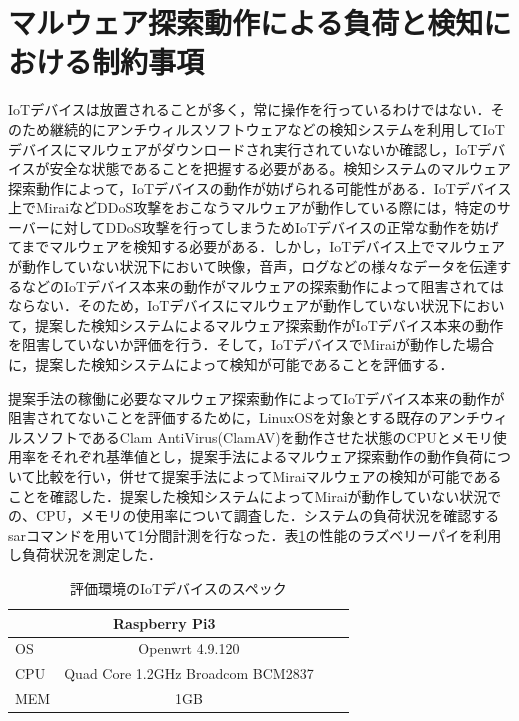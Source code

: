 \section{マルウェア探索動作による負荷と検知における制約事項}
IoTデバイスは放置されることが多く，常に操作を行っているわけではない．そのため継続的にアンチウィルスソフトウェアなどの検知システムを利用してIoTデバイスにマルウェアがダウンロードされ実行されていないか確認し，IoTデバイスが安全な状態であることを把握する必要がある。検知システムのマルウェア探索動作によって，IoTデバイスの動作が妨げられる可能性がある．IoTデバイス上でMiraiなどDDoS攻撃をおこなうマルウェアが動作している際には，特定のサーバーに対してDDoS攻撃を行ってしまうためIoTデバイスの正常な動作を妨げてまでマルウェアを検知する必要がある．しかし，IoTデバイス上でマルウェアが動作していない状況下において映像，音声，ログなどの様々なデータを伝達するなどのIoTデバイス本来の動作がマルウェアの探索動作によって阻害されてはならない．そのため，IoTデバイスにマルウェアが動作していない状況下において，提案した検知システムによるマルウェア探索動作がIoTデバイス本来の動作を阻害していないか評価を行う．そして，IoTデバイスでMiraiが動作した場合に，提案した検知システムによって検知が可能であることを評価する．\par
提案手法の稼働に必要なマルウェア探索動作によってIoTデバイス本来の動作が阻害されてないことを評価するために，LinuxOSを対象とする既存のアンチウィルスソフトであるClam AntiVirus(ClamAV)を動作させた状態のCPUとメモリ使用率をそれぞれ基準値とし，提案手法によるマルウェア探索動作の動作負荷について比較を行い，併せて提案手法によってMiraiマルウェアの検知が可能であることを確認した．提案した検知システムによってMiraiが動作していない状況での、CPU，メモリの使用率について調査した．システムの負荷状況を確認するsarコマンドを用いて1分間計測を行なった．表\ref{tab:spec}の性能のラズベリーパイを利用し負荷状況を測定した．
\begin{table}[h]
   \caption{評価環境のIoTデバイスのスペック}
   \label{tab:spec}
   \centering
   \begin{tabular}{|l|c|l|l|l|}
   \hline
   \multicolumn{3}{|c|}{Raspberry Pi3} \\ \hline
   OS     & \multicolumn{2}{c|}{Openwrt 4.9.120}                   \\ \hline
   CPU    & \multicolumn{2}{c|}{Quad Core 1.2GHz Broadcom BCM2837} \\ \hline
   MEM    & \multicolumn{2}{c|}{1GB}                               \\ \hline
   \end{tabular}
\end{table}

